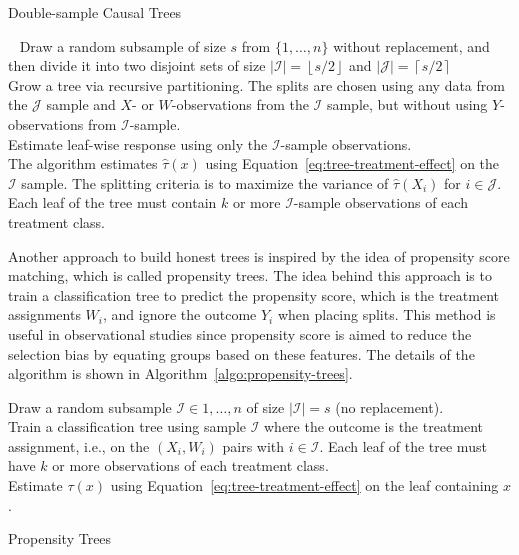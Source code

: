 \documentclass{article}
\begin{document}
\LinesNumberedHidden
\begin{algorithm}[h]

  \caption{Double-sample Causal Trees}~\label{algo:double-sample-trees}
  \ShowLn Draw a random subsample of size $s$ from $\{1, \ldots, n\}$ without
  replacement, and then divide it into two disjoint sets of size
  $|\mathcal{I}|=\left \lfloor s/2 \right \rfloor$ and
  $|\mathcal{J}|=\left \lceil s/2 \right \rceil$ \\
  \ShowLn Grow a tree via recursive partitioning. The splits are chosen using
  any data from the $\mathcal{J}$ sample and $X$- or $W$-observations
  from the $\mathcal{I}$ sample, but without using $Y$-observations
  from $\mathcal{I}$-sample. \\
  \ShowLn Estimate leaf-wise response using only the $\mathcal{I}$-sample
  observations. \\ [1\baselineskip]

The algorithm estimates $\hat{\tau}(x)$ using
Equation~\ref{eq:tree-treatment-effect} on the $\mathcal{I}$
sample. The splitting criteria is to maximize the variance of
$\hat{\tau}(X_i)$ for $i \in \mathcal{J}$. Each leaf of the tree must
contain $k$ or more $\mathcal{I}$-sample observations of each
treatment class.
\end{algorithm}
Another approach to build honest trees is inspired by the idea of
propensity score matching, which is called propensity trees. The idea
behind this approach is to train a classification tree to predict the
propensity score, which is the treatment assignments $W_i$, and ignore the outcome $Y_i$ when
placing splits. This method is useful in observational studies
since propensity score is aimed to reduce the selection bias by
equating groups based on these features. The details of the
algorithm is shown in Algorithm~\ref{algo:propensity-trees}.

\LinesNumberedHidden
\begin{algorithm}[h]
  \ShowLn Draw a random subsample $\mathcal{I} \in {1, \ldots, n}$ of
  size $|\mathcal{I}| = s$ (no replacement). \\
  \ShowLn Train a classification tree using sample $\mathcal{I}$ where
  the outcome is the treatment assignment, i.e., on the $(X_i, W_i)$
  pairs with $i \in \mathcal{I}$. Each leaf of the tree must have $k$
  or more observations of each treatment class. \\
  \ShowLn Estimate $\tau(x)$ using
  Equation~\ref{eq:tree-treatment-effect} on the leaf containing $x$.
  \caption{Propensity Trees}~\label{algo:propensity-trees}
\end{algorithm}
\end{document}
